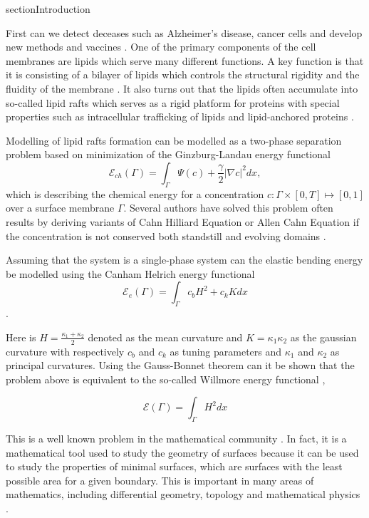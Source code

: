 section{Introduction}\label{sec:introduction}



First can we detect deceases such as Alzheimer's disease, cancer cells and develop new methods and vaccines \cite{small2006sorting}. One of the primary components of the cell membranes are lipids which serve many different functions. A key function is that it is consisting of a bilayer of lipids which controls the structural rigidity and the fluidity of the membrane \cite{ neidleman87}. It also turns out that the lipids often accumulate into so-called lipid rafts which serves as a rigid platform for proteins with special properties such as intracellular trafficking of lipids and lipid-anchored proteins \cite{Edidin03}.

Modelling of lipid rafts formation can be modelled as a two-phase separation problem based on minimization of the Ginzburg-Landau energy functional \cite{yushutin19}
\[
\mathcal{E}_{ch}  \left( \Gamma  \right) = \int_{\Gamma  }^{}\Psi \left( c \right) + \frac{\gamma}{2} \left\lvert \nabla c \right\rvert^{2} dx,
\]
which is describing the chemical energy for a concentration $c: \Gamma \times \left[ 0,T \right] \mapsto  \left[ 0,1 \right]  $ over a surface membrane $\Gamma$. Several authors have solved this problem often results by deriving variants of Cahn
Hilliard Equation or Allen Cahn Equation if the concentration is not conserved both standstill and evolving domains \cite{yushutin19, udo97, ratz16,Gera2017, caetano21,yushutin19} .

Assuming that the system is a single-phase system can the elastic bending energy be modelled using the Canham Helrich energy functional \cite{wang08, udo97} \[
\mathcal{E} _{e}\left( \Gamma  \right) =   \int_{\Gamma }^{}  c_{b} H^{2} + c_{k} K  dx
\].

Here is $H = \frac{ \kappa_1 + \kappa_2 }{2}$ denoted as the mean curvature and $K = \kappa_1 \kappa_2$ as the gaussian curvature with respectively $c_{b}$ and $c_{k}$ as tuning parameters and $\kappa_1$ and $\kappa_2$ as principal curvatures. Using
the Gauss-Bonnet theorem can it be shown that the problem above is equivalent to the so-called Willmore energy
functional \cite[Ch 8.5 Thm 8.29]{montiel2009curves},

\[
\mathcal{E} \left( \Gamma  \right) = \int_{\Gamma }^{}  H ^2 dx
\]

This is a well known problem in the mathematical community \cite{ topping2000towards, marques2014willmore}. In fact, it is a mathematical tool used to study the geometry of surfaces because it can be used to study the properties of minimal surfaces, which are surfaces with the least
possible area for a given boundary. This is important in many areas of mathematics, including differential geometry, topology and mathematical physics \cite{koerber2021area,jakob2022singularities, rupp21}.

